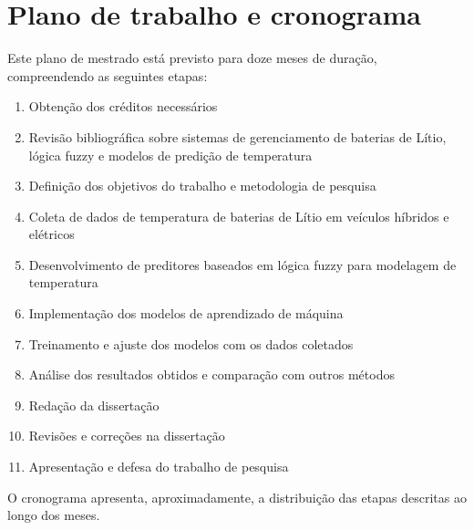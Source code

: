 \section{Plano de trabalho e cronograma}

Este plano de mestrado está previsto para doze meses de duração,
compreendendo as seguintes etapas:
 
\renewcommand{\labelenumi}{\alph{enumi})}
\begin{enumerate} 
    \item Obtenção dos créditos necessários
    \item Revisão bibliográfica sobre sistemas de gerenciamento de baterias de Lítio, lógica fuzzy e modelos de predição de temperatura
    \item Definição dos objetivos do trabalho e metodologia de pesquisa
    \item Coleta de dados de temperatura de baterias de Lítio em veículos híbridos e elétricos
    \item Desenvolvimento de preditores baseados em lógica fuzzy para modelagem de temperatura
    \item Implementação dos modelos de aprendizado de máquina
    \item Treinamento e ajuste dos modelos com os dados coletados
    \item Análise dos resultados obtidos e comparação com outros métodos
    \item Redação da dissertação
    \item Revisões e correções na dissertação
    \item Apresentação e defesa do trabalho de pesquisa
\end{enumerate}
 
 O cronograma apresenta, aproximadamente, a distribuição das etapas descritas ao longo dos meses.

\def\mystartdate{2022-08}%
\def\myenddate{2024-08}%

